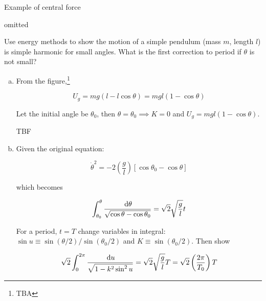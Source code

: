 \begin{example}
	Example of central force
\end{example}

\begin{sol}
	omitted
\end{sol}

\begin{example}
	Use energy methods to show the motion of a simple pendulum (mass $m$, length $l$) is simple harmonic for small angles. What is the first correction to period if $\theta$ is not small?
\end{example}

\begin{sol}
	\begin{enumerate}[a)]
		\item From the figure,\footnote{TBA}

		\begin{equation}
			U_g = mg(l - l\cos\theta) = mgl(1-\cos\theta)
		\end{equation}

		Let the initial angle be $\theta_0$, then $\theta = \theta_0 \implies K = 0$ and $U_g = mgl(1-\cos\theta)$.

		TBF

		\item Given the original equation:
		
		\begin{equation}
			\dot \theta^2 = -2\left(\frac{g}{l}\right) \left[\cos\theta_0 - \cos\theta\right]
		\end{equation}

		which becomes

		\begin{equation}
			\int_{\theta_0}^\theta \frac{\D \theta}{\sqrt{\cos\theta - \cos\theta_0}} = \sqrt{2} \sqrt{\frac{g}{l}} t
		\end{equation}

		For a period, $t = T$ change variables in integral: $\sin u \equiv \sin(\theta / 2) / \sin(\theta_0 / 2)$ and $K \equiv \sin(\theta_0 / 2)$. Then show

		\begin{equation}
			\sqrt{2} \int_0^{2\pi} \frac{\D u}{\sqrt{1 - k^2\sin^2 u}} = \sqrt{2} \sqrt{\frac{g}{l}} T = \sqrt{2} \left(\frac{2\pi}{T_0}\right) T
		\end{equation}
	\end{enumerate}
\end{sol}